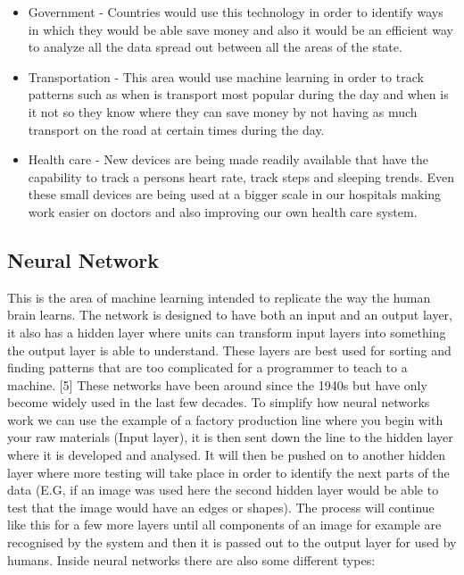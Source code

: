 \documentclass[letterpaper, 10 pt, conference]{ieeeconf}  %
\begin{document}
\begin{itemize}
\item Government - Countries would use this technology in order to identify ways in which they would be able save money and also it would be an efficient way to analyze all the data spread out between all the areas of the state.
\end{itemize}

\begin{itemize}
\item Transportation - This area would use machine learning in order to track patterns such as when is transport most popular during the day and when is it not so they know where they can save money by not having as much transport on the road at certain times during the day.
\end{itemize}

\begin{itemize}
\item Health care - New devices are being made readily available that have the capability  to track a persons heart rate, track steps and sleeping trends. Even these small devices are being used at a bigger scale in our hospitals making work easier on doctors and also improving our own health care system.
\end{itemize}

\subsection{Neural Network}
This is the area of machine learning intended to replicate the way the human brain learns. The network is designed to have both an input and an output layer, it also has a hidden layer where units can transform input layers into something the output layer is able to understand. These layers are best used for sorting and finding patterns that are too complicated for a programmer to teach to a machine. [5] These networks have been around since the 1940s but have only become widely used in the last few decades. To simplify how neural networks work we can use the example of a factory production line where you begin with your raw materials (Input layer), it is then sent down the line to the hidden layer where it is developed and analysed. It will then be pushed on to another hidden layer where more testing will take place in order to identify the next parts of the data (E.G, if an image was used here the second hidden layer would be able to test that the image would have an edges or shapes). The process will continue like this for a few more layers until all components of an image for example are recognised by the system and then it is passed out to the output layer for used by humans. 
Inside neural networks there are also some different types:
\end{document}
